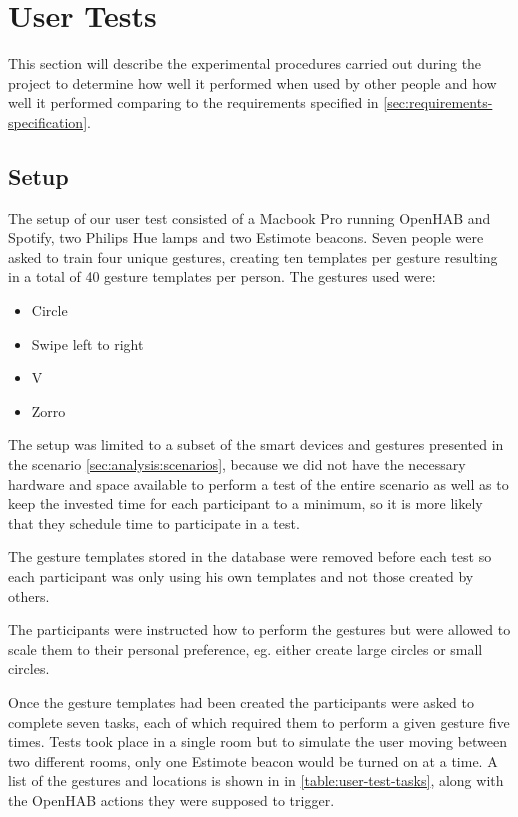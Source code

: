 \section{User Tests}
\label{sec:evaluation:user-tests}

This section will describe the experimental procedures carried out during the project to determine how well it performed when used by
other people and how well it performed comparing to the requirements specified in \cref{sec:requirements-specification}.

\subsection{Setup}
\label{sec:evaluation:user-tests-setup}

The setup of our user test consisted of a Macbook Pro running OpenHAB and Spotify, two Philips Hue lamps and two Estimote beacons.
Seven people were asked to train four unique gestures, creating ten templates per gesture resulting in a total of 40 gesture templates
per person.
The gestures used were:

\begin{itemize}
  \item Circle
  \item Swipe left to right
  \item V
  \item Zorro
\end{itemize}

The setup was limited to a subset of the smart devices and gestures presented in the scenario \cref{sec:analysis:scenarios}, because we did not have the necessary hardware and space available to perform a test of the entire scenario as well as to keep the invested time for each participant to a minimum, so it is more likely that they schedule time to participate in a test.

The gesture templates stored in the database were removed before each test so each participant was only using his own templates and not those created by others.

The participants were instructed how to perform the gestures but were allowed to scale them to their personal preference, eg.
either create large circles or small circles.

Once the gesture templates had been created the participants were asked to complete seven tasks, each of which required them to perform a given gesture five times.
Tests took place in a single room but to simulate the user moving between two different rooms, only one Estimote beacon would be turned on at a time.
A list of the gestures and locations is shown in in \cref{table:user-test-tasks}, along with the OpenHAB actions they were supposed to trigger.

